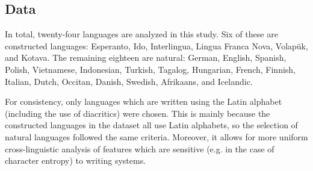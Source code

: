 \documentclass[12pt,a4paper]{article}
\numberwithin{figure}{section}
\numberwithin{table}{section}
\numberwithin{definition}{section}
\begin{document}
\subsection{Data}
\label{ssec:data}

In total, twenty-four languages are analyzed in this study. Six of these are constructed languages: Esperanto, Ido, Interlingua, Lingua Franca Nova, Volapük, and Kotava. The remaining eighteen are natural: German, English, Spanish, Polish, Vietnamese, Indonesian, Turkish, Tagalog, Hungarian, French, Finnish, Italian, Dutch, Occitan, Danish, Swedish, Afrikaans, and Icelandic. 

For consistency, only languages which are written using the Latin alphabet (including the use of diacritics) were chosen. This is mainly because the constructed languages in the dataset all use Latin alphabets, so the selection of natural languages followed the same criteria. Moreover, it allows for more uniform cross-linguistic analysis of features which are sensitive (e.g. in the case of character entropy) to writing systems.

\end{document}
